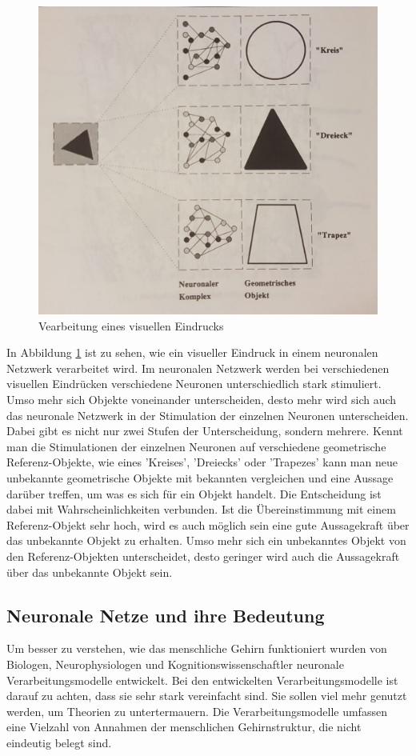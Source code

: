\begin{figure}[hbt]
	\centering
	\includegraphics[width=0.9\linewidth]{./Bilder/VerarbeitungVisuellerEindruck-Kratzer}
	\caption{Vearbeitung eines visuellen Eindrucks \cite[S. 9]{Kratzer1991}}
	\label{fig:visuelleVerarbeitung}
\end{figure}

In Abbildung \ref{fig:visuelleVerarbeitung} ist zu sehen, wie ein visueller Eindruck in einem neuronalen Netzwerk verarbeitet wird. Im neuronalen Netzwerk werden bei verschiedenen visuellen Eindrücken verschiedene Neuronen unterschiedlich stark stimuliert. Umso mehr sich Objekte voneinander unterscheiden, desto mehr wird sich auch das neuronale Netzwerk in der Stimulation der einzelnen Neuronen unterscheiden. Dabei gibt es nicht nur zwei Stufen der Unterscheidung, sondern mehrere. Kennt man die Stimulationen der einzelnen Neuronen auf verschiedene geometrische Referenz-Objekte, wie eines 'Kreises', 'Dreiecks' oder 'Trapezes' kann man neue unbekannte geometrische Objekte mit bekannten vergleichen und eine Aussage darüber treffen, um was es sich für ein Objekt handelt. Die Entscheidung ist dabei mit Wahrscheinlichkeiten verbunden. Ist die Übereinstimmung mit einem Referenz-Objekt sehr hoch, wird es auch möglich sein eine gute Aussagekraft über das unbekannte Objekt zu erhalten. Umso mehr sich ein unbekanntes Objekt von den Referenz-Objekten unterscheidet, desto geringer wird auch die Aussagekraft über das unbekannte Objekt sein.

\subsection[Neuronale Netze und ihre Bedeutung]{Neuronale Netze und ihre Bedeutung \cite{Kratzer1991}}
Um besser zu verstehen, wie das menschliche Gehirn funktioniert wurden von Biologen, Neurophysiologen und Kognitionswissenschaftler neuronale Verarbeitungsmodelle entwickelt. Bei den entwickelten Verarbeitungsmodelle ist darauf zu achten, dass sie sehr stark vereinfacht sind. Sie sollen viel mehr genutzt werden, um Theorien zu untertermauern. Die Verarbeitungsmodelle umfassen eine Vielzahl von Annahmen der menschlichen Gehirnstruktur, die nicht eindeutig belegt sind.

